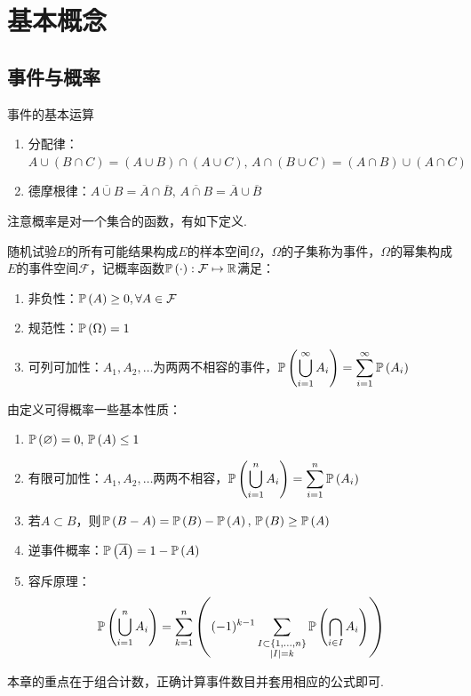 
\section{基本概念}
\subsection{事件与概率}
\begin{proposition}事件的基本运算
	\begin{enumerate}
		\itemsep -3pt
		\item 分配律：$A\cup(B\cap C)=(A\cup B)\cap(A\cup C),\,A\cap(B\cup C)=(A\cap B)\cup(A\cap C)$
		\item 德摩根律：$\overline{A\cup B}=\overline{A}\cap\overline{B},\,\overline{A\cap B}=\overline{A}\cup\overline{B}$
	\end{enumerate}
\end{proposition}
注意概率是对一个集合的函数，有如下定义.
\begin{definition}[概率]
	随机试验$E$的所有可能结果构成$E$的样本空间$\Omega$，$\Omega$的子集称为事件，$\Omega$的幂集构成$E$的事件空间$\mathcal{F}$，记概率函数$\mathbb{P}\left(\cdot\right):\mathcal{F}\mapsto\mathbb{R}$满足：
	\begin{enumerate}
		\itemsep -3pt
		\item 非负性：$\mathbb{P}\left(A\right)\geq 0,\forall A\in\mathcal{F}$
		\item 规范性：$\mathbb{P}\left(\Omega\right)=1$
		\item 可列可加性：$A_1,A_2,\ldots$为两两不相容的事件，$\displaystyle \mathbb{P}\left(\bigcup_{i=1}^\infty A_i\right)=\sum_{i=1}^\infty \mathbb{P}\left(A_i\right)$
	\end{enumerate}
\end{definition}
由定义可得概率一些基本性质：
\begin{enumerate}
	\itemsep -3pt
	\item $\mathbb{P}\left(\varnothing\right)=0,\,\mathbb{P}\left(A\right)\leq 1$
	\item 有限可加性：$A_1,A_2,\ldots$两两不相容，$\displaystyle \mathbb{P}\left(\bigcup_{i=1}^n A_i\right)=\sum_{i=1}^n \mathbb{P}\left(A_i\right)$
	\item 若$A\subset B$，则$\mathbb{P}\left(B-A\right)=\mathbb{P}\left(B\right)-\mathbb{P}\left(A\right),\,\mathbb{P}\left(B\right)\geq \mathbb{P}\left(A\right)$
	\item 逆事件概率：$\mathbb{P}\left(\overline{A}\right)=1-\mathbb{P}\left(A\right)$
	\item 容斥原理：
	\[\mathbb{P}\left(\bigcup _{{i=1}}^{n}A_{i}\right)=\sum _{{k=1}}^{n}\left((-1)^{{k-1}}\sum _{\substack{I\subset \{1,\ldots ,n\}\\|I|=k}}\mathbb{P}\left(\bigcap _{{i\in I}}A_{i}\right)\right)\]
\end{enumerate}
\par 本章的重点在于组合计数，正确计算事件数目并套用相应的公式即可.

